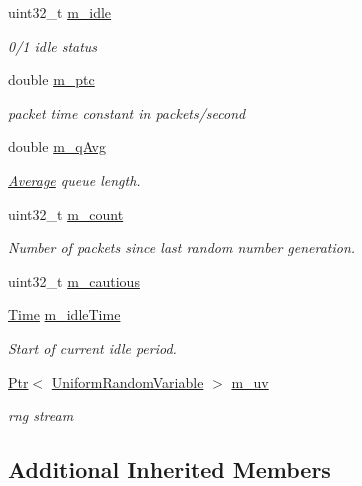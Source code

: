 \begin{DoxyCompactItemize}
uint32\+\_\+t \hyperlink{classns3_1_1RedQueueDisc_ac7afefb55642b1fdc733d017448e5234}{m\+\_\+idle}
\begin{DoxyCompactList}\small\item\em 0/1 idle status \end{DoxyCompactList}\item 
double \hyperlink{classns3_1_1RedQueueDisc_aa0e1d78172897574d39e59b873ec9401}{m\+\_\+ptc}
\begin{DoxyCompactList}\small\item\em packet time constant in packets/second \end{DoxyCompactList}\item 
double \hyperlink{classns3_1_1RedQueueDisc_ad51f583bf9d9964833fd8a710a40e247}{m\+\_\+q\+Avg}
\begin{DoxyCompactList}\small\item\em \hyperlink{classns3_1_1Average}{Average} queue length. \end{DoxyCompactList}\item 
uint32\+\_\+t \hyperlink{classns3_1_1RedQueueDisc_ac096c7624d6d921f4612e6e1852193f7}{m\+\_\+count}
\begin{DoxyCompactList}\small\item\em Number of packets since last random number generation. \end{DoxyCompactList}\item 
uint32\+\_\+t \hyperlink{classns3_1_1RedQueueDisc_a2156a26538fe0259220ca9e57c829c34}{m\+\_\+cautious}
\item 
\hyperlink{classns3_1_1Time}{Time} \hyperlink{classns3_1_1RedQueueDisc_a004c1bec6f513969e91ddd353bd336e2}{m\+\_\+idle\+Time}
\begin{DoxyCompactList}\small\item\em Start of current idle period. \end{DoxyCompactList}\item 
\hyperlink{classns3_1_1Ptr}{Ptr}$<$ \hyperlink{classns3_1_1UniformRandomVariable}{Uniform\+Random\+Variable} $>$ \hyperlink{classns3_1_1RedQueueDisc_ac8e5d222b2cbd02e3e940e129f36c76c}{m\+\_\+uv}
\begin{DoxyCompactList}\small\item\em rng stream \end{DoxyCompactList}\end{DoxyCompactItemize}
\subsection*{Additional Inherited Members}


